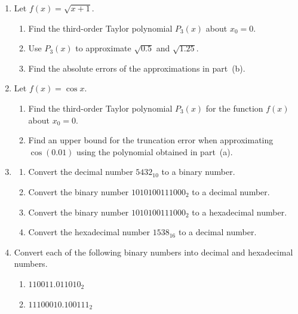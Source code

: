 \begin{enumerate}[
    label=\arabic*.,
    leftmargin=1.5em,
    itemsep=0.4em,
    parsep=0.1em
]

    \item Let \(f(x)=\sqrt{x+1}\).
    \begin{enumerate}[
        label=(\alph*),
        leftmargin=2em,
        itemsep=0pt,
        topsep=0.2em,
        parsep=0pt,
        partopsep=0pt
    ]
        \item Find the third-order Taylor polynomial \(P_3(x)\)
        about \(x_0=0\).
        \item Use \(P_3(x)\) to approximate
        \(\sqrt{0.5}\) and \(\sqrt{1.25}\).
        \item Find the absolute errors of the approximations in part~(b).
    \end{enumerate}

    \item Let \(f(x)=\cos x\).
    \begin{enumerate}[
        label=(\alph*),
        leftmargin=2em,
        itemsep=0pt,
        topsep=0.2em,
        parsep=0pt,
        partopsep=0pt
    ]
        \item Find the third-order Taylor polynomial \(P_3(x)\)
        for the function \(f(x)\) about \(x_0=0\).
        \item Find an upper bound for the truncation error when
        approximating \(\cos(0.01)\) using the polynomial obtained
        in part~(a).
    \end{enumerate}

    \item
    \begin{enumerate}[
        label=(\alph*),
        leftmargin=2em,
        itemsep=0pt,
        topsep=0pt,
        parsep=0pt,
        partopsep=0pt
    ]
        \item Convert the decimal number \(5432_{10}\) to a binary number.
        \item Convert the binary number
        \(1010100111000_2\) to a decimal number.
        \item Convert the binary number
        \(1010100111000_2\) to a hexadecimal number.
        \item Convert the hexadecimal number
        \(1538_{16}\) to a decimal number.
    \end{enumerate}

    \item Convert each of the following binary numbers into decimal
    and hexadecimal numbers.
    \begin{enumerate}[
        label=(\alph*),
        leftmargin=2em,
        itemsep=0pt,
        topsep=0.2em,
        parsep=0pt,
        partopsep=0pt
    ]
        \item \(110011.011010_2\)
        \item \(11100010.100111_2\)
    \end{enumerate}


\end{enumerate}
